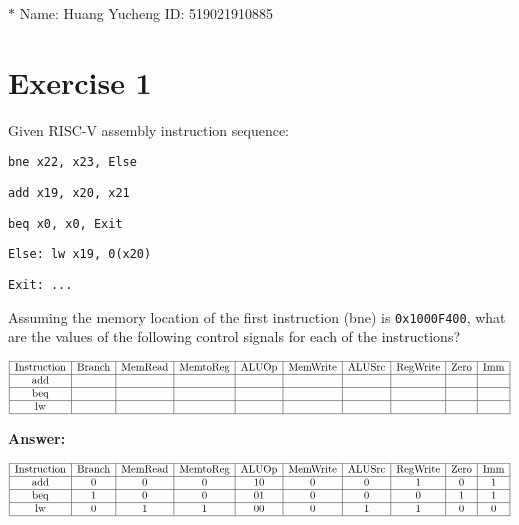 \documentclass[11pt,a4paper]{article}
\begin{document}
\noindent{}

\begin{center}

\footnotesize{\color{blue}$*$ Name: Huang Yucheng ID: 519021910885}
\end{center}

\section*{Exercise 1}
Given RISC-V assembly instruction sequence:

\verb|bne x22, x23, Else|

\verb|add x19, x20, x21|

\verb|beq x0, x0, Exit|

\verb|Else: lw x19, 0(x20)|

\verb|Exit: ...|

Assuming the memory location of the first instruction (bne) is \verb|0x1000F400|, what are the values of the following control signals for each of the instructions?

$$
\begin{array}{|c|c|c|c|c|c|c|c|c|c|}
\hline \text {Instruction} & \text{Branch}& \text{MemRead}& \text{MemtoReg}& \text{ALUOp}& \text{MemWrite}&\text{ALUSrc} & \text{RegWrite}&\text{Zero} &\text{Imm} \\
\hline \text {add} & & & & & & & & & \\
\hline \text {beq} & & & & & & & & & \\
\hline \text {lw} & & & & & & & & & \\
\hline
\end{array}
$$
\vspace{0.3cm}

\textbf{Answer:}

$$
\begin{array}{|c|c|c|c|c|c|c|c|c|c|}
\hline \text {Instruction} & \text{Branch}& \text{MemRead}& \text{MemtoReg}& \text{ALUOp}& \text{MemWrite}&\text{ALUSrc} & \text{RegWrite}&\text{Zero} &\text{Imm} \\
\hline \text {add} &0 &0 &0 &10 &0 &0 &1 &0 &1 \\
\hline \text {beq} &1 &0 &0 &01 &0 &0 &0 &1 &1 \\
\hline \text {lw} &0 &1 &1 &00 &0 &1 &1 &0 &0 \\
\hline
\end{array}
$$
\end{document}
